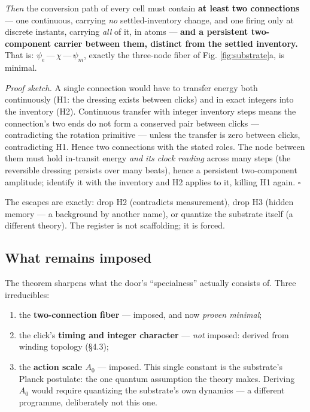 \emph{Then} the conversion path of every cell must contain \textbf{at
least two connections} --- one continuous, carrying \emph{no}
settled-inventory change, and one firing only at discrete instants,
carrying \emph{all} of it, in atoms --- \textbf{and a persistent
two-component carrier between them, distinct from the settled
inventory.} That is: \(\psi_e\,\)---\(\,\chi\,\)---\(\,\psi_m\), exactly
the three-node fiber of Fig. \ref{fig:substrate}a, is minimal.

\emph{Proof sketch.} A single connection would have to transfer energy
both continuously (H1: the dressing exists between clicks) and in exact
integers into the inventory (H2). Continuous transfer with integer
inventory steps means the connection's two ends do not form a conserved
pair between clicks --- contradicting the rotation primitive --- unless
the transfer is zero between clicks, contradicting H1. Hence two
connections with the stated roles. The node between them must hold
in-transit energy \emph{and its clock reading} across many steps (the
reversible dressing persists over many beats), hence a persistent
two-component amplitude; identify it with the inventory and H2 applies
to it, killing H1 again. \(\square\)

The escapes are exactly: drop H2 (contradicts measurement), drop H3
(hidden memory --- a background by another name), or quantize the
substrate itself (a different theory). The register is not scaffolding;
it is forced.

\subsection{What remains imposed}\label{what-remains-imposed}

The theorem sharpens what the door's ``specialness'' actually consists
of. Three irreducibles:

\begin{enumerate}
\def\labelenumi{\arabic{enumi}.}
\tightlist
\item
  the \textbf{two-connection fiber} --- imposed, and now \emph{proven
  minimal};
\item
  the click's \textbf{timing and integer character} --- \emph{not}
  imposed: derived from winding topology (§4.3);
\item
  the \textbf{action scale \(A_0\)} --- imposed. This single constant is
  the substrate's Planck postulate: the one quantum assumption the
  theory makes. Deriving \(A_0\) would require quantizing the
  substrate's own dynamics --- a different programme, deliberately not
  this one.
\end{enumerate}

